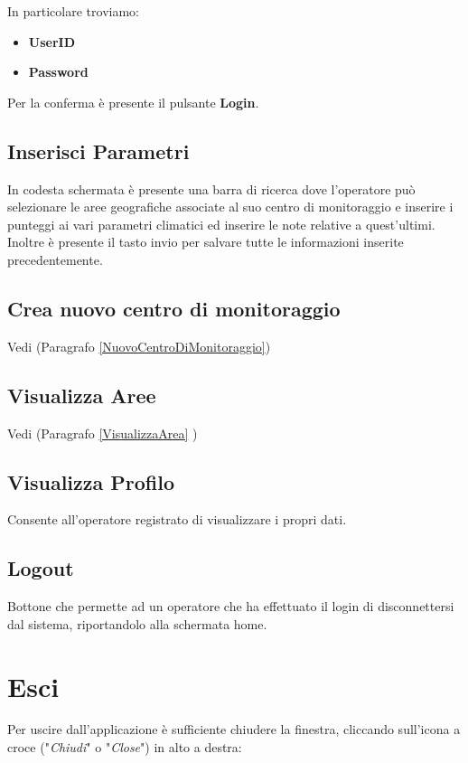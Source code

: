 In particolare troviamo:
\begin{itemize}
	\item \textbf{UserID} 
	\item \textbf{Password}
\end{itemize} 

Per la conferma è presente il pulsante \textbf{Login}.
\subsection{Inserisci Parametri}
In codesta schermata è presente una barra di ricerca dove l'operatore può selezionare le aree geografiche associate al suo centro di monitoraggio e inserire i punteggi ai vari parametri climatici ed inserire le note relative a quest'ultimi.
Inoltre è presente il tasto invio per salvare tutte le informazioni inserite precedentemente.


\subsection{Crea nuovo centro di monitoraggio}
Vedi (Paragrafo \ref{NuovoCentroDiMonitoraggio})
\subsection{Visualizza Aree}
Vedi (Paragrafo \ref{VisualizzaArea} )

\subsection{Visualizza Profilo} \label{Profilo}
Consente all'operatore registrato di visualizzare i propri dati.

\subsection{Logout}
Bottone che permette ad un operatore che ha effettuato il login di disconnettersi dal sistema, riportandolo alla schermata home. 

\section{Esci}
Per uscire dall'applicazione è sufficiente chiudere la finestra, cliccando sull'icona a croce ("\textit{Chiudi}" o "\textit{Close}") in alto a destra:

